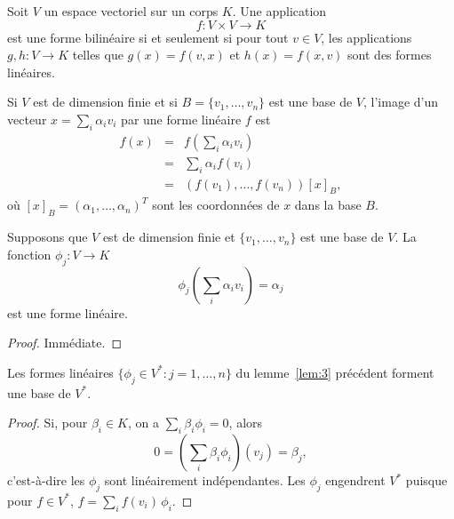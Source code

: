 \begin{remark}
  \label{def:10}
  Soit $V$ un espace vectoriel sur un corps $K$. Une application 
  \begin{displaymath}
    f\colon V \times V \longrightarrow K
  \end{displaymath}
  est une forme bilinéaire si et seulement si pour tout $v \in V$,
  les applications $g,h: V \longrightarrow K$
  telles que $g(x) = f(v,x)$
  et $h(x) = f(x,v)$ sont des formes linéaires.
\end{remark}

Si $V$ est de dimension finie et si $B = \{v_1,\dots,v_n\}$ est une base de $V$, l'image d'un vecteur $x = \sum_i\alpha_i v_i$ par une forme linéaire $f$ est 
\begin{eqnarray*}
    f(x) & = &  f\left(\sum_i\alpha_i v_i\right) \\
         & = & \sum_i \alpha_i f(v_i)  \\
         & = & (f(v_1),\dots,f(v_n)) [x]_B,               
\end{eqnarray*}
où $[x]_B = (\alpha_1,\dots,\alpha_n)^T$ sont les coordonnées de $x$ dans la base $B$.  





\begin{lemma}
  \label{lem:3} Supposons que $V$ est de dimension finie et $\{v_1,\dots,v_n\}$ est une base de $V$. 
  La fonction $\phi_j\colon V \longrightarrow K$ 
    \begin{displaymath}
  \phi_j \left(\sum_i \alpha_i v_i \right) =  \alpha_j 
\end{displaymath}
est une forme linéaire. 
\end{lemma}
\begin{proof}
  Immédiate. 
\end{proof}

\begin{theorem}
  \label{thr:7}
  Les formes linéaires $\{\phi_j \in V^* \colon j=1,\dots,n\}$ du lemme~\ref{lem:3} précédent  forment une base de $V^*$.
\end{theorem}

\begin{proof}
  Si, pour $\beta_i \in K$, on a $\sum_i \beta_i \phi_i = 0$, alors 
  \begin{displaymath}
 0 =    \left(\sum_i \beta_i \phi_i\right) (v_j) =  \beta_j,
  \end{displaymath}
c'est-à-dire  les $\phi_j$ sont linéairement indépendantes. Les $\phi_j$ engendrent $V^*$ puisque pour $f \in V^*$, $f = \sum_i  f(v_i)  \, \phi_i$. 
\end{proof}

